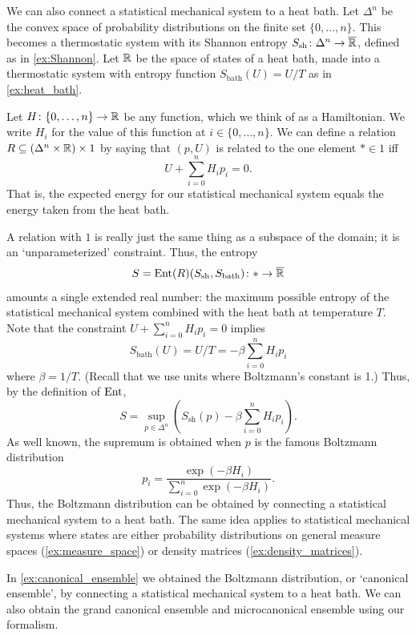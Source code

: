 \documentclass[12pt, reqno]{amsart}
\newcommand{\extreal}{\overline{\real}}
\newcommand{\Ssh}{S_{\mathrm{sh}}} %
\newcommand{\Sbath}{S_{\mathrm{bath}}} %
\begin{document}
\begin{example} \label{ex:canonical_ensemble}
    We can also connect a statistical mechanical system to a heat bath. Let $\Delta^n$ be the convex space of probability distributions on the finite set $\{0,\dots,n\}$. This becomes a thermostatic system with its Shannon entropy $\Ssh \maps \Delta^n \to \extreal$, defined as in \cref{ex:Shannon}. Let $\mathbb{R}$ be the space of states of a heat bath, made into a thermostatic system with entropy function $\Sbath(U) = U/T$ as in \cref{ex:heat_bath}.
    
    Let $H \colon \{0,\dots,n\} \rightarrow \mathbb{R}$ be any function, which we think of as a Hamiltonian. We write $H_i$ for the value of this function at $i \in \{0,\dots,n\}$. We can define a relation $R \subseteq (\Delta^n \times \mathbb{R}) \times 1$ by saying that $(p,U)$ is related to the one element $\ast \in 1$ iff
    \[ U + \sum_{i=0}^n H_i p_i = 0 .\]
    That is, the expected energy for our statistical mechanical system equals the energy taken from the heat bath. 
    
    A relation with $1$ is really just the same thing as a subspace of the domain; it is an `unparameterized' constraint. Thus, the entropy
    \[    S = \Ent(R)(\Ssh,\Sbath) \maps \ast \to \extreal \]
    amounts a single extended real number: the maximum possible entropy of the statistical mechanical system combined with the heat bath at temperature $T$. Note that the constraint $U + \sum_{i=0}^n H_i p_i = 0$ implies
    \[ \Sbath(U) = U/T = -\beta \sum_{i=0}^n H_i p_i \]
    where $\beta = 1/T$. (Recall that we use units where Boltzmann's constant is 1.)  Thus, by the definition of $\mathrm{Ent}$,
    \[ S = \sup_{p \in \Delta^n} \left(\Ssh(p) - \beta \sum_{i=0}^n H_i p_i \right).\]
    As well known, the supremum is obtained when $p$ is the famous Boltzmann distribution
    \[p_i = \frac{\exp(-\beta H_i)}{\sum_{i=0}^n \exp(-\beta H_i)} .\]
    Thus, the Boltzmann distribution can be obtained by connecting a statistical mechanical system to a heat bath. The same idea applies to statistical mechanical systems where states are either probability distributions on general measure spaces (\cref{ex:measure_space}) or density matrices (\cref{ex:density_matrices}).
\end{example}

In \cref{ex:canonical_ensemble} we obtained the Boltzmann distribution, or `canonical ensemble', by connecting a statistical mechanical system to a heat bath. We can also obtain the grand canonical ensemble and microcanonical ensemble using our formalism.
\end{document}
